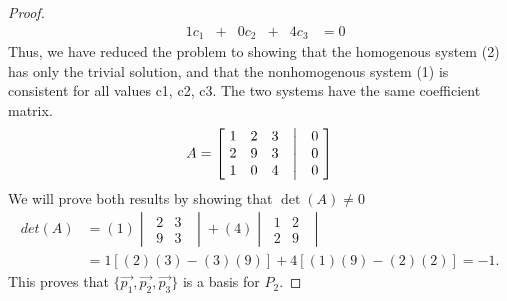 \documentclass[../main.tex]{subfiles}
\begin{document}
\begin{proof}
$$\begin{matrix}
       & 1c_{1} & + & 0c_{2} & + & 4c_{3} & = 0
    \end{matrix}
  $$
  Thus, we have reduced the problem to showing that the homogenous system (2) has only the trivial solution, and that the nonhomogenous system (1) is consistent for all values c1, c2, c3.
  The two systems have the same coefficient matrix.
  \begin{align*}
    A = \begin{bmatrix}
      \ 1 & 2 & 3 & \bigm| & 0\ \\
      \ 2 & 9 & 3 & \bigm| & 0\ \\
      \ 1 & 0 & 4 & \bigm| & 0\
    \end{bmatrix}
  \end{align*}
  We will prove both results by showing that $\det(A) \neq 0$
  \begin{align*}
    det(A) & = (1)
    \begin{vmatrix}
      \ 2 & 3 \   \\
      \ 9 & 3 \ \
    \end{vmatrix}
    + (4)
    \begin{vmatrix}
      \ 1 & 2 \   \\
      \ 2 & 9 \ \
    \end{vmatrix}                            \\
           & = 1[(2)(3)-(3)(9)] + 4[(1)(9)-(2)(2)] = -1.
  \end{align*}
  This proves that $\{\vec{p_{1}}, \vec{p_{2}}, \vec{p_{3}}\}$ is a basis for $P_2$.
\end{proof}
\pagebreak
\end{document}
